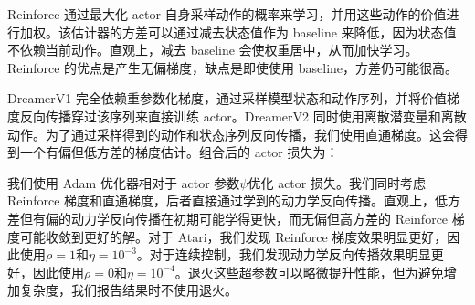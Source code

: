 Reinforce\citep{williams1992reinforce} 通过最大化 actor 自身采样动作的概率来学习，并用这些动作的价值进行加权。该估计器的方差可以通过减去状态值作为 baseline 来降低，因为状态值不依赖当前动作。直观上，减去 baseline 会使权重居中，从而加快学习。Reinforce 的优点是产生无偏梯度，缺点是即使使用 baseline，方差仍可能很高。

DreamerV1 完全依赖重参数化梯度\citep{kingma2013vae,rezende2014vae}，通过采样模型状态和动作序列，并将价值梯度反向传播穿过该序列来直接训练 actor。DreamerV2 同时使用离散潜变量和离散动作。为了通过采样得到的动作和状态序列反向传播，我们使用直通梯度\citep{bengio2013straight}。这会得到一个有偏但低方差的梯度估计。组合后的 actor 损失为：


我们使用 Adam 优化器相对于 actor 参数$\psi$优化 actor 损失。我们同时考虑 Reinforce 梯度和直通梯度，后者直接通过学到的动力学反向传播。直观上，低方差但有偏的动力学反向传播在初期可能学得更快，而无偏但高方差的 Reinforce 梯度可能收敛到更好的解。对于 Atari，我们发现 Reinforce 梯度效果明显更好，因此使用$\rho=1$和$\eta=10^{-3}$。对于连续控制，我们发现动力学反向传播效果明显更好，因此使用$\rho=0$和$\eta=10^{-4}$。退火这些超参数可以略微提升性能，但为避免增加复杂度，我们报告结果时不使用退火。
